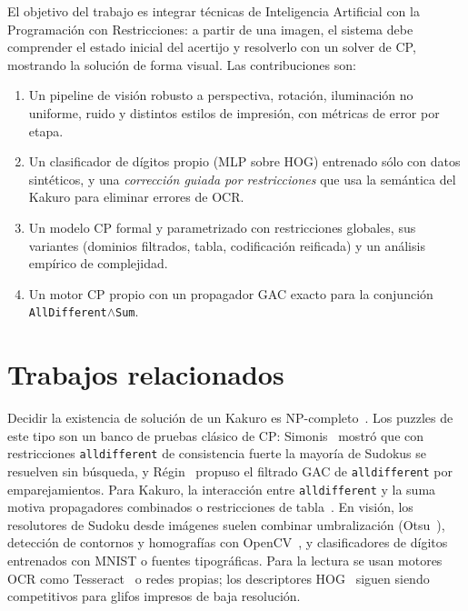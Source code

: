 \documentclass[conference,a4paper]{IEEEtran}\def\HAVEIEEE{1}%
\begin{document}
El objetivo del trabajo es integrar técnicas de Inteligencia Artificial con la Programación con Restricciones: a partir de una imagen, el sistema debe comprender el estado inicial del acertijo y resolverlo con un solver de CP, mostrando la solución de forma visual. Las contribuciones son:
\begin{enumerate}
  \item Un pipeline de visión robusto a perspectiva, rotación, iluminación no uniforme, ruido y distintos estilos de impresión, con métricas de error por etapa.
  \item Un clasificador de dígitos propio (MLP sobre HOG) entrenado sólo con datos sintéticos, y una \emph{corrección guiada por restricciones} que usa la semántica del Kakuro para eliminar errores de OCR.
  \item Un modelo CP formal y parametrizado con restricciones globales, sus variantes (dominios filtrados, tabla, codificación reificada) y un análisis empírico de complejidad.
  \item Un motor CP propio con un propagador GAC exacto para la conjunción \texttt{AllDifferent}$\wedge$\texttt{Sum}.
\end{enumerate}

\section{Trabajos relacionados}
Decidir la existencia de solución de un Kakuro es NP-completo~\cite{seta2002,ruepp2010}. Los puzzles de este tipo son un banco de pruebas clásico de CP: Simonis~\cite{simonis2005} mostró que con restricciones \texttt{alldifferent} de consistencia fuerte la mayoría de Sudokus se resuelven sin búsqueda, y Régin~\cite{regin1994} propuso el filtrado GAC de \texttt{alldifferent} por emparejamientos. Para Kakuro, la interacción entre \texttt{alldifferent} y la suma motiva propagadores combinados o restricciones de tabla~\cite{rossi2006}. En visión, los resolutores de Sudoku desde imágenes suelen combinar umbralización (Otsu~\cite{otsu1979}), detección de contornos y homografías con OpenCV~\cite{opencv}, y clasificadores de dígitos entrenados con MNIST o fuentes tipográficas. Para la lectura se usan motores OCR como Tesseract~\cite{smith2007} o redes propias; los descriptores HOG~\cite{dalal2005} siguen siendo competitivos para glifos impresos de baja resolución.

\end{document}
